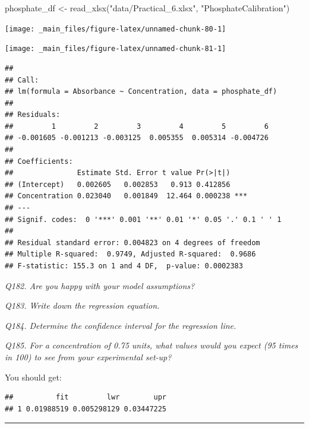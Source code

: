 \documentclass[
  11pt,
  a4paper,
]{book}
\newenvironment{Shaded}{\begin{snugshade}}{\end{snugshade}}
\newcommand{\FunctionTok}[1]{\textcolor[rgb]{0.00,0.00,0.00}{#1}}
\newcommand{\NormalTok}[1]{#1}
\newcommand{\OtherTok}[1]{\textcolor[rgb]{0.56,0.35,0.01}{#1}}
\newcommand{\StringTok}[1]{\textcolor[rgb]{0.31,0.60,0.02}{#1}}
\begin{document}
\begin{Shaded}
\begin{Highlighting}[]
\NormalTok{phosphate\_df }\OtherTok{\textless{}{-}} \FunctionTok{read\_xlsx}\NormalTok{(}\StringTok{"data/Practical\_6.xlsx"}\NormalTok{, }\StringTok{"PhosphateCalibration"}\NormalTok{)}
\end{Highlighting}
\end{Shaded}

\begin{center}\texttt{[image: \_main\_files/figure-latex/unnamed-chunk-80-1]} \end{center}

\begin{center}\texttt{[image: \_main\_files/figure-latex/unnamed-chunk-81-1]} \end{center}

\begin{verbatim}
## 
## Call:
## lm(formula = Absorbance ~ Concentration, data = phosphate_df)
## 
## Residuals:
##         1         2         3         4         5         6 
## -0.001605 -0.001213 -0.003125  0.005355  0.005314 -0.004726 
## 
## Coefficients:
##               Estimate Std. Error t value Pr(>|t|)    
## (Intercept)   0.002605   0.002853   0.913 0.412856    
## Concentration 0.023040   0.001849  12.464 0.000238 ***
## ---
## Signif. codes:  0 '***' 0.001 '**' 0.01 '*' 0.05 '.' 0.1 ' ' 1
## 
## Residual standard error: 0.004823 on 4 degrees of freedom
## Multiple R-squared:  0.9749, Adjusted R-squared:  0.9686 
## F-statistic: 155.3 on 1 and 4 DF,  p-value: 0.0002383
\end{verbatim}

\emph{Q182. Are you happy with your model assumptions?}

\emph{Q183. Write down the regression equation.}

\emph{Q184. Determine the confidence interval for the regression line.}

\emph{Q185. For a concentration of 0.75 units, what values would you expect (95 times in 100) to see from your experimental set-up?}

You should get:

\begin{verbatim}
##          fit         lwr        upr
## 1 0.01988519 0.005298129 0.03447225
\end{verbatim}

\begin{center}\rule{0.5\linewidth}{0.5pt}\end{center}
\end{document}

